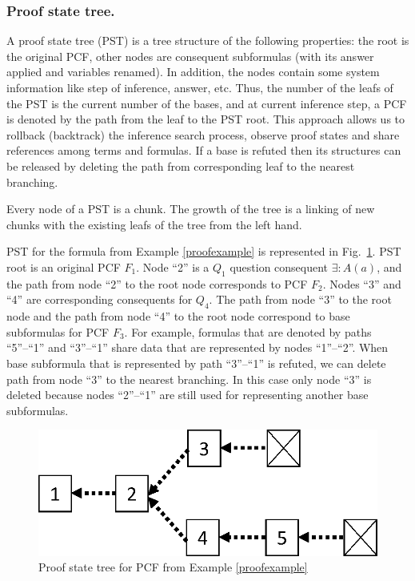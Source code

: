\documentclass[runningheads,a4paper]{llncs}
\begin{document}
\subsubsection{Proof state tree.}
A proof state tree (PST) is a tree structure of the following properties: the root is the original PCF, other nodes are consequent subformulas (with its answer applied and variables renamed). In addition, the nodes contain some system information like step of inference, answer, etc. Thus, the number of the leafs of the PST is the current number of the bases, and at current inference step, a PCF is denoted by the path from the leaf to the PST root. This approach allows us to rollback (backtrack) the inference search process, observe proof states and share references among terms and formulas. If a base is refuted then its structures can be released by deleting the path from corresponding leaf to the nearest branching.

Every node of a PST is a chunk. The growth of the tree is a linking of new chunks with the existing leafs of the tree from the left hand.

PST for the formula from Example \ref{proofexample} is represented in Fig.~\ref{fig:pst}.
PST root is an original PCF $F_1$. Node ``2'' is a  $Q_1$ question consequent $\exists\colon A(a)$, and the path from node ``2'' to the root node corresponds to PCF $F_2$. Nodes ``3'' and ``4'' are corresponding consequents for $Q_4$. The path from node ``3'' to the root node and the path from node ``4'' to the root node correspond to base subformulas for PCF $F_3$. For example, formulas that are denoted by paths ``5''--``1'' and ``3''--``1'' share data that are represented by nodes ``1''--``2''. When base subformula that is represented by path ``3''--``1'' is refuted, we can delete path from node ``3'' to the nearest branching. In this case only node ``3'' is deleted because nodes ``2''--``1'' are still used for representing another base subformulas.
\begin{figure}[h]
  \centering
  \includegraphics[width=0.4\linewidth]{img/PSTp1.eps}
  \caption{Proof state tree for PCF from Example \ref{proofexample}}
  \label{fig:pst}
\end{figure}
\end{document}
